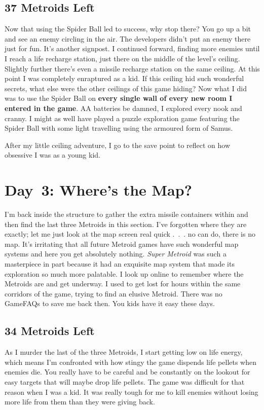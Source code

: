 \documentclass{book}
\begin{document}
\FloatBarrier\subsection*{37 Metroids Left}
Now that using the Spider Ball led to success, why stop there? You go up a bit and see an enemy circling in the air. The developers didn’t put an enemy there just for fun. It’s another signpost. I continued forward, finding more enemies until I reach a life recharge station, just there on the middle of the level’s ceiling. Slightly further there’s even a missile recharge station on the same ceiling. At this point I was completely enraptured as a kid. If this ceiling hid such wonderful secrets, what else were the other ceilings of this game hiding? Now what I did was to use the Spider Ball on \textbf{every single wall of every new room I entered in the game}. AA batteries be damned, I explored every nook and cranny. I might as well have played a puzzle exploration game featuring the Spider Ball with some light travelling using the armoured form of Samus.\par
After my little ceiling adventure, I go to the save point to reflect on how obsessive I was as a young kid.\par
\FloatBarrier\section*{Day~3: Where’s the Map?}
I’m back inside the structure to gather the extra missile containers within and then find the last three Metroids in this section. I’ve forgotten where they are exactly; let me just look at the map screen real quick .~.~. no can do, there is no map. It’s irritating that all future Metroid games have such wonderful map systems and here you get absolutely nothing. \emph{Super Metroid} was such a masterpiece in part because it had an exquisite map system that made its exploration so much more palatable. I look up online to remember where the Metroids are and get underway. I used to get lost for hours within the same corridors of the game, trying to find an elusive Metroid. There was no GameFAQs to save me back then. You kids have it easy these days.\par
\FloatBarrier\subsection*{34 Metroids Left}
As I murder the last of the three Metroids, I start getting low on life energy, which means I’m confronted with how stingy the game dispends life pellets when enemies die. You really have to be careful and be constantly on the lookout for easy targets that will maybe drop life pellets. The game was difficult for that reason when I was a kid. It was really tough for me to kill enemies without losing more life from them than they were giving back.\par
\end{document}
